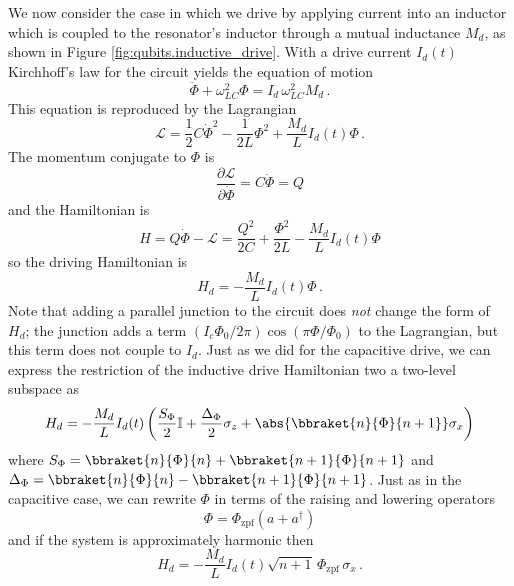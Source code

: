 We now consider the case in which we drive by applying current into an inductor which is coupled to the resonator's inductor through a mutual inductance $M_d$, as shown in Figure \ref{fig:qubits.inductive_drive}.
With a drive current $I_d(t)$ Kirchhoff's law for the circuit yields the equation of motion
\begin{equation}
  \ddot{\Phi} + \omega_{LC}^2 \Phi = I_d \, \omega_{LC}^2 M_d \, .
\end{equation}
This equation is reproduced by the Lagrangian
\begin{equation}
  \mathcal{L} = \frac{1}{2}C \dot{\Phi}^2 - \frac{1}{2L} \Phi^2 + \frac{M_d}{L}I_d(t) \Phi \, .
\end{equation}
The momentum conjugate to $\Phi$ is
\begin{equation}
  \frac{\partial \mathcal{L}}{\partial \dot{\Phi}} = C \dot{\Phi} = Q
\end{equation}
and the Hamiltonian is
\begin{equation}
  H
  = Q \dot{\Phi} - \mathcal{L}
  = \frac{Q^2}{2C} + \frac{\Phi^2}{2L} - \frac{M_d}{L} I_d(t) \Phi
\end{equation}
so the driving Hamiltonian is
\begin{equation}
  H_d = - \frac{M_d}{L}I_d(t) \Phi \, .
\end{equation}
Note that adding a parallel junction to the circuit does \emph{not} change the form of $H_d$; the junction adds a term $(I_c \Phi_0 / 2\pi)\cos(\pi \Phi / \Phi_0)$ to the Lagrangian, but this term does not couple to $I_d$.
Just as we did for the capacitive drive, we can express the restriction of the inductive drive Hamiltonian two a two-level subspace as
\begin{equation*}
  H_d = -\frac{M_d}{L} I_d(t) \left(
      \frac{S_\Phi}{2} \mathbb{I}
    + \frac{\Delta_\Phi}{2} \sigma_z
    + \abs{\bbraket{n}{\Phi}{n+1}} \sigma_x
  \right)
\end{equation*}
where $S_\Phi = \bbraket{n}{\Phi}{n} + \bbraket{n+1}{\Phi}{n+1}$ and $\Delta_\Phi = \bbraket{n}{\Phi}{n} - \bbraket{n+1}{\Phi}{n+1}$.
Just as in the capacitive case, we can rewrite $\Phi$ in terms of the raising and lowering operators
\begin{equation*}
  \Phi = \Phi_\text{zpf} (a + a^\dagger)
\end{equation*}
and if the system is approximately harmonic then
\begin{equation*}
  H_d = - \frac{M_d}{L} I_d(t) \sqrt{n+1} \, \Phi_\text{zpf} \, \sigma_x
  \, .
\end{equation*}
